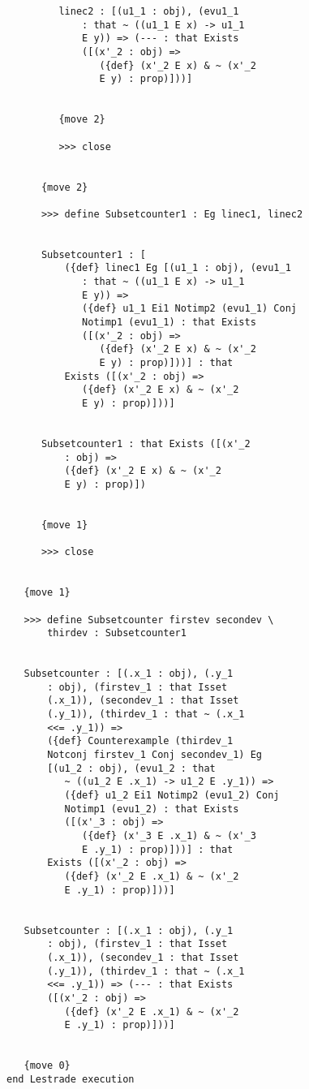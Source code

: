 \documentclass[12pt]{article}
\begin{document}
\begin{verbatim}
         linec2 : [(u1_1 : obj), (evu1_1 
             : that ~ ((u1_1 E x) -> u1_1 
             E y)) => (--- : that Exists 
             ([(x'_2 : obj) => 
                ({def} (x'_2 E x) & ~ (x'_2 
                E y) : prop)]))]


         {move 2}

         >>> close


      {move 2}

      >>> define Subsetcounter1 : Eg linec1, linec2


      Subsetcounter1 : [
          ({def} linec1 Eg [(u1_1 : obj), (evu1_1 
             : that ~ ((u1_1 E x) -> u1_1 
             E y)) => 
             ({def} u1_1 Ei1 Notimp2 (evu1_1) Conj 
             Notimp1 (evu1_1) : that Exists 
             ([(x'_2 : obj) => 
                ({def} (x'_2 E x) & ~ (x'_2 
                E y) : prop)]))] : that 
          Exists ([(x'_2 : obj) => 
             ({def} (x'_2 E x) & ~ (x'_2 
             E y) : prop)]))]


      Subsetcounter1 : that Exists ([(x'_2 
          : obj) => 
          ({def} (x'_2 E x) & ~ (x'_2 
          E y) : prop)])


      {move 1}

      >>> close


   {move 1}

   >>> define Subsetcounter firstev secondev \
       thirdev : Subsetcounter1


   Subsetcounter : [(.x_1 : obj), (.y_1 
       : obj), (firstev_1 : that Isset 
       (.x_1)), (secondev_1 : that Isset 
       (.y_1)), (thirdev_1 : that ~ (.x_1 
       <<= .y_1)) => 
       ({def} Counterexample (thirdev_1 
       Notconj firstev_1 Conj secondev_1) Eg 
       [(u1_2 : obj), (evu1_2 : that 
          ~ ((u1_2 E .x_1) -> u1_2 E .y_1)) => 
          ({def} u1_2 Ei1 Notimp2 (evu1_2) Conj 
          Notimp1 (evu1_2) : that Exists 
          ([(x'_3 : obj) => 
             ({def} (x'_3 E .x_1) & ~ (x'_3 
             E .y_1) : prop)]))] : that 
       Exists ([(x'_2 : obj) => 
          ({def} (x'_2 E .x_1) & ~ (x'_2 
          E .y_1) : prop)]))]


   Subsetcounter : [(.x_1 : obj), (.y_1 
       : obj), (firstev_1 : that Isset 
       (.x_1)), (secondev_1 : that Isset 
       (.y_1)), (thirdev_1 : that ~ (.x_1 
       <<= .y_1)) => (--- : that Exists 
       ([(x'_2 : obj) => 
          ({def} (x'_2 E .x_1) & ~ (x'_2 
          E .y_1) : prop)]))]


   {move 0}
end Lestrade execution
\end{verbatim}
\end{document}
